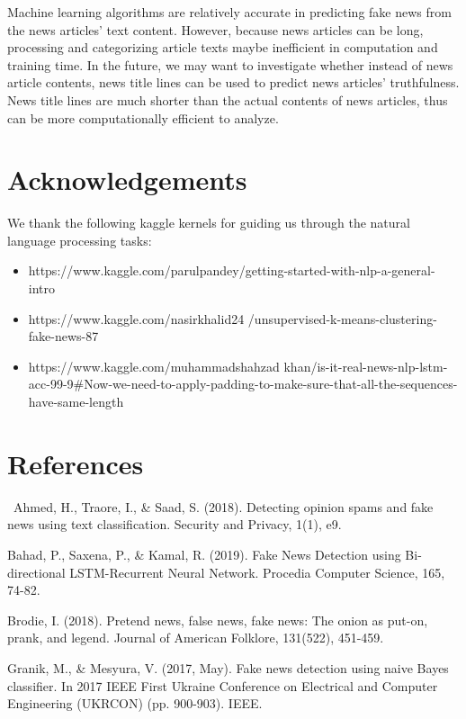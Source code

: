 \documentclass{article}
\begin{document}
\begin{multicols}{2}
Machine learning algorithms are relatively accurate in predicting fake news from the news articles' text content. However, because news articles can be long, processing and categorizing article texts maybe inefficient in computation and training time. In the future, we may want to investigate whether instead of news article contents, news title lines can be used to predict news articles' truthfulness. News title lines are much shorter than the actual contents of news articles, thus can be more computationally efficient to analyze. 




\section{Acknowledgements}

We thank the following kaggle kernels for guiding us through the natural language processing tasks:
\begin{itemize}
    \item https://www.kaggle.com/parulpandey/getting-started-with-nlp-a-general-intro
    \item https://www.kaggle.com/nasirkhalid24 /unsupervised-k-means-clustering-fake-news-87
    \item https://www.kaggle.com/muhammadshahzad
    khan/is-it-real-news-nlp-lstm-acc-99-9#Now-we-need-to-apply-padding-to-make-sure-that-all-the-sequences-have-same-length
\end{itemize}


\section{References}

\quad \, Ahmed, H., Traore, I., \& Saad, S. (2018). Detecting opinion spams and fake news using text classification. Security and Privacy, 1(1), e9.

Bahad, P., Saxena, P., \& Kamal, R. (2019). Fake News Detection using Bi-directional LSTM-Recurrent Neural Network. Procedia Computer Science, 165, 74-82.

Brodie, I. (2018). Pretend news, false news, fake news: The onion as put-on, prank, and legend. Journal of American Folklore, 131(522), 451-459.

Granik, M., \& Mesyura, V. (2017, May). Fake news detection using naive Bayes classifier. In 2017 IEEE First Ukraine Conference on Electrical and Computer Engineering (UKRCON) (pp. 900-903). IEEE.


\end{multicols}
\end{document}

